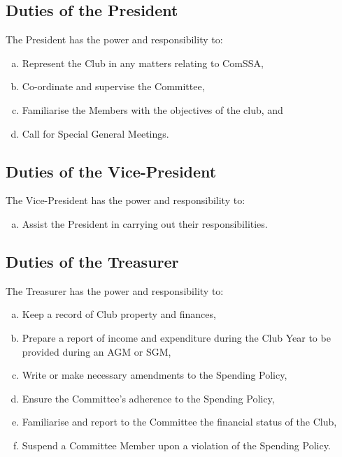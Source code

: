 \documentclass[a4paper,12pt]{article}
\begin{document}
\subsection{Duties of the President}

The President has the power and responsibility to:

\begin{enumerate}[a)]
	\item Represent the Club in any matters relating to ComSSA,
	\item Co-ordinate and supervise the Committee,
	\item Familiarise the Members with the objectives of the club, and
	\item Call for Special General Meetings.
\end{enumerate}

\subsection{Duties of the Vice-President}

The Vice-President has the power and responsibility to:

\begin{enumerate}[a)]
	\item Assist the President in carrying out their responsibilities.
\end{enumerate}

\subsection{Duties of the Treasurer}

The Treasurer has the power and responsibility to:

\begin{enumerate}[a)]
	\item Keep a record of Club property and finances,
	\item Prepare a report of income and expenditure during the Club Year to be provided during an AGM or SGM,
	\item Write or make necessary amendments to the Spending Policy,
	\item Ensure the Committee's adherence to the Spending Policy,
	\item Familiarise and report to the Committee the financial status of the Club,
	\item Suspend a Committee Member upon a violation of the Spending Policy.
\end{enumerate}
\end{document}
